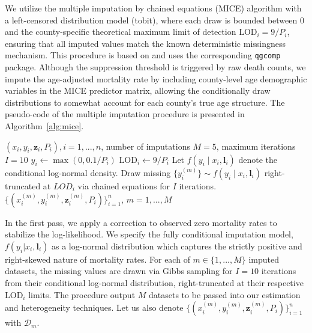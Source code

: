 \documentclass{article}
\theoremstyle{plain}
\theoremstyle{definition}
\theoremstyle{remark}
\begin{document}
We utilize the multiple imputation by chained equations
(MICE) algorithm with a left-censored distribution model
(tobit), where each draw is bounded between 0 and the county-specific theoretical maximum limit of detection $\text{LOD}_i =9/P_i$, ensuring that all imputed values match the known deterministic missingness mechanism. This procedure is based on \citet{keil2019quantile}
and uses the corresponding \texttt{qgcomp} package.
Although the suppression threshold is triggered by raw death counts, we impute the age-adjusted mortality rate
by including county-level age demographic variables in
the MICE predictor matrix, allowing the conditionally
draw distributions to somewhat account for each county's true age structure. The pseudo-code of the multiple imputation procedure is presented in Algorithm~\ref{alg:mice}.





\begin{algorithm}[t]
   \caption{Multiple Imputation of Left-Censored CVD Mortality Rates}
   \label{alg:mice}
\begin{algorithmic}
    $(x_i,y_i,\mathbf z_i, P_i), i=1,...,n$, number of imputations $M=5$, maximum iterations $I=10$
        \STATE $y_i \leftarrow \max(0, 0.1 / P_i)$ \hfill
           \STATE $\text{LOD}_i \leftarrow 9 / P_i$ \hfill
       \ENDIF
   \ENDFOR
   \STATE Let $f(y_i \mid x_i, \mathbf l_i)$ denote the conditional log-normal density.
       \STATE Draw missing $\{y_i^{(m)}\} \sim f(y_i \mid x_i, \mathbf l_i)$ right-truncated at $LOD_i$ via chained equations for $I$ iterations.
   \ENDFOR
     $\{(x_i^{(m)},y_i^{(m)},\mathbf z_i^{(m)}, P_i)\}_{i=1}^n$, $m = 1,...,M$
\end{algorithmic}
\end{algorithm}

In the first pass, we apply a correction to observed zero mortality rates to stabilize the log-likelihood.
We specify the fully conditional imputation model, $f(y_i|x_i, \mathbf l_i)$ as a log-normal distribution which captures the strictly positive and right-skewed nature of mortality rates. For each of $m \in \{1,...,M\}$ imputed datasets, the missing values are drawn via Gibbs sampling for $I = 10$ iterations from 
their conditional log-normal distribution, right-truncated at their respective $\text{LOD}_i$ limits.
The procedure output $M$ datasets to be passed into
our estimation and heterogeneity techniques.
Let us also denote $\{(x_i^{(m)},y_i^{(m)},\mathbf z_i^{(m)}, P_i)\}_{i=1}^n$ with $\mathcal D_m$.
\end{document}

